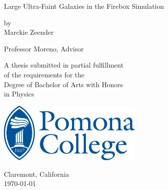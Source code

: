 \documentclass[12pt, oneside]{book}
\begin{document}
\begin{titlepage}
\begin{center}

\vspace*{2cm}

{\huge Large Ultra-Faint Galaxies in the Firebox Simulation} %

\vspace{2cm}

{\large by\\Marckie Zeender}

\vspace{2cm}
{Professor Moreno, Advisor}

\vfill

A thesis submitted in partial fulfillment\\
of the requirements for the\\
Degree of Bachelor of Arts with Honors\\
in Physics

\vspace*{1.5cm}

\includegraphics[width=200pt]{pomona.eps}

\vspace*{0.5cm}
Claremont, California\\
\today %
\end{center}
\end{titlepage}

\frontmatter 


\end{document}
